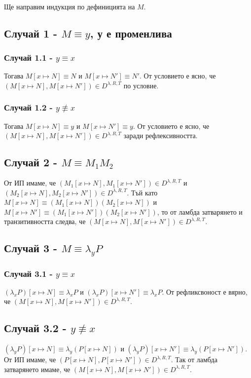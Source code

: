 \documentclass[12pt]{article}
\begin{document}
\paragraph*{}
Ще направим индукция по дефиницията на $M$.

\subsection*{Случай 1 - $M \equiv y$, у е променлива}
\subsubsection*{Случай 1.1 - $y \equiv x$}
Тогава $M[x \longmapsto N] \equiv N$ и $M[x \longmapsto N'] \equiv N'$. От условието е ясно, че $(M[x \longmapsto N], M[x \longmapsto N']) \in D^{\lambda, R, T}$ по условие.
\subsubsection*{Случай 1.2 - $y \not\equiv x$}
Тогава $M[x \longmapsto N] \equiv y$ и $M[x \longmapsto N'] \equiv y$. От условието е ясно, че $(M[x \longmapsto N], M[x \longmapsto N']) \in D^{\lambda, R, T}$ заради рефлексивността.

\subsection*{Случай 2 - $M \equiv M_1 M_2$}
От ИП имаме, че $(M_1[x \longmapsto N], M_1[x \longmapsto N']) \in D^{\lambda, R, T}$ и $(M_2[x \longmapsto N], M_2[x \longmapsto N']) \in D^{\lambda, R, T}$. Тъй като $M[x \longmapsto N] \equiv (M_1[x \longmapsto N])(M_2[x \longmapsto N])$ и $M[x \longmapsto N'] \equiv (M_1[x \longmapsto N'])(M_2[x \longmapsto N'])$, то от ламбда затварянето и транзитивността следва, че $(M[x \longmapsto N], M[x \longmapsto N']) \in D^{\lambda, R, T}$.

\subsection*{Случай 3 - $M \equiv \lambda_y P$}
\subsubsection*{Случай 3.1 - $y \equiv x$}
$(\lambda_x P)[x \longmapsto N] \equiv \lambda_x P$ и $(\lambda_x P)[x \longmapsto N'] \equiv \lambda_x P$. От рефликсвоност е вярно, че $(M[x \longmapsto N], M[x \longmapsto N']) \in D^{\lambda, R, T}$.
\subsection*{Случай 3.2 - $y \not\equiv x$}
$(\lambda_y P)[x \longmapsto N] \equiv \lambda_y (P [x \longmapsto N])$ и $(\lambda_y P)[x \longmapsto N'] \equiv \lambda_y (P [x \longmapsto N'])$. От ИП имаме, че $(P [x \longmapsto N], P [x \longmapsto N']) \in D^{\lambda, R, T}$. Так от ламбда затварянето имаме, че $(M[x \longmapsto N], M[x \longmapsto N']) \in D^{\lambda, R, T}$.
\end{document}
